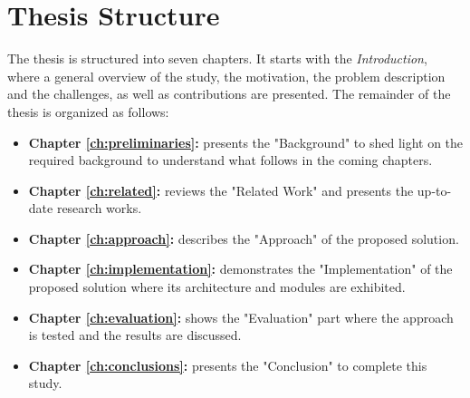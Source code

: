 \section {Thesis Structure}
The thesis is structured into seven chapters. 
It starts with the \emph{Introduction}, where a general overview of the study, the motivation, the problem description and the challenges, as well as contributions are presented. 
The remainder of the thesis is organized as follows:
\begin{itemize}
	\item { \textbf{Chapter \ref{ch:preliminaries}:} presents the "Background" to shed light on the required background to understand what follows in the coming chapters.}
	
	\item {\textbf{Chapter \ref{ch:related}:}} reviews the "Related Work" and presents the up-to-date research works. 
		
	\item {\textbf{Chapter \ref{ch:approach}:}} describes the "Approach" of the proposed solution. 
	
	\item {\textbf{Chapter \ref{ch:implementation}:}} demonstrates the "Implementation" of the proposed solution where its architecture and modules are exhibited.
	
	\item {\textbf{Chapter \ref{ch:evaluation}:}} shows the "Evaluation" part where the approach is tested and the results are discussed.

	\item {\textbf{Chapter \ref{ch:conclusions}:}} presents the "Conclusion" to complete this study.
\end{itemize}






